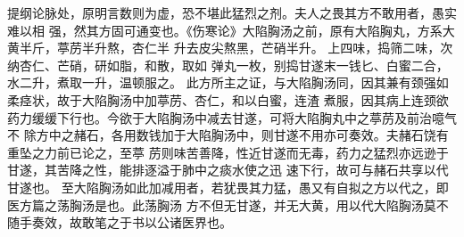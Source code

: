 \documentclass[a4paper,12pt,UTF8,twoside]{ctexbook}
\begin{document}
提纲论脉处，原明言数则为虚，恐不堪此猛烈之剂。夫人之畏其方不敢用者，愚实难以相 
强，然其方固可通变也。《伤寒论》大陷胸汤之前，原有大陷胸丸，方系大黄半斤，葶苈半升熬，杏仁半 
升去皮尖熬黑，芒硝半升。 
上四味，捣筛二味，次纳杏仁、芒硝，研如脂，和散，取如 
弹丸一枚，别捣甘遂末一钱匕、白蜜二合，水二升，煮取一升，温顿服之。 
此方所主之证，与大陷胸汤同，因其兼有颈强如柔痉状，故于大陷胸汤中加葶苈、杏仁，和以白蜜，连渣 
煮服，因其病上连颈欲药力缓缓下行也。今欲于大陷胸汤中减去甘遂，可将大陷胸丸中之葶苈及前治噫气不 
除方中之赭石，各用数钱加于大陷胸汤中，则甘遂不用亦可奏效。夫赭石饶有重坠之力前已论之，至葶 
苈则味苦善降，性近甘遂而无毒，药力之猛烈亦远逊于甘遂，其苦降之性，能排逐溢于肺中之痰水使之迅 
速下行，故可与赭石共享以代甘遂也。 
至大陷胸汤如此加减用者，若犹畏其力猛，愚又有自拟之方以代之，即医方篇之荡胸汤是也。此荡胸汤 
方不但无甘遂，并无大黄，用以代大陷胸汤莫不随手奏效，故敢笔之于书以公诸医界也。 
\end{document}
